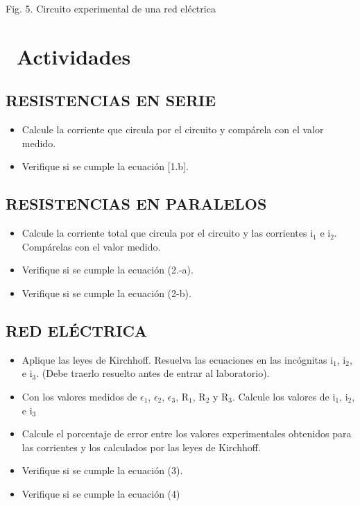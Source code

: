 \documentclass[11pt,a4paper]{article}
\newcommand{\iconotexto}[2]{\textcolor{cyanNeon}{\faIcon{#1}}~#2}
\begin{document}
Fig. 5. Circuito experimental de una red eléctrica

\section{\iconotexto{calculator}{Actividades}}

\subsection*{RESISTENCIAS EN SERIE}

\begin{itemize}[leftmargin=1.4em,itemsep=2pt,topsep=3pt]
  \item Calcule la corriente que circula por el circuito y compárela con el valor medido.
  \item Verifique si se cumple la ecuación [1.b].
\end{itemize}

\subsection*{RESISTENCIAS EN PARALELOS}

\begin{itemize}[leftmargin=1.4em,itemsep=2pt,topsep=3pt]
  \item Calcule la corriente total que circula por el circuito y las corrientes i$_{1}$ e i$_{2}$. Compárelas con el valor medido.
  \item Verifique si se cumple la ecuación (2.-a).
  \item Verifique si se cumple la ecuación (2-b).
\end{itemize}

\subsection*{RED ELÉCTRICA}

\begin{itemize}[leftmargin=1.4em,itemsep=2pt,topsep=3pt]
  \item Aplique las leyes de Kirchhoff. Resuelva las ecuaciones en las incógnitas i$_{1}$, i$_{2}$, e i$_{3}$. (Debe traerlo resuelto antes de entrar al laboratorio).
  \item Con los valores medidos de $\epsilon_{1}$, $\epsilon_{2}$, $\epsilon_{3}$, R$_{1}$, R$_{2}$ y R$_{3}$. Calcule los valores de i$_{1}$, i$_{2}$, e i$_{3}$
  \item Calcule el porcentaje de error entre los valores experimentales obtenidos para las corrientes y los calculados por las leyes de Kirchhoff.
  \item Verifique si se cumple la ecuación (3).
  \item Verifique si se cumple la ecuación (4)
\end{itemize}
\end{document}
